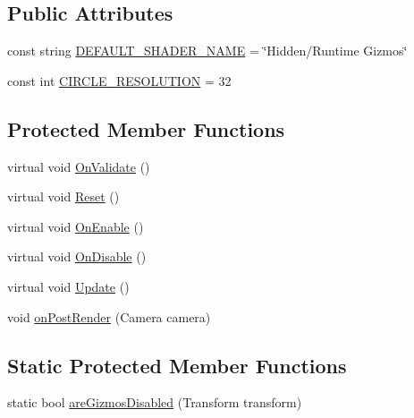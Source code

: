 \subsection*{Public Attributes}
\begin{DoxyCompactItemize}
\item 
const string \mbox{\hyperlink{class_leap_1_1_unity_1_1_runtime_gizmos_1_1_runtime_gizmo_manager_a9908e17033f014eb3d4212ee7b87e137}{D\+E\+F\+A\+U\+L\+T\+\_\+\+S\+H\+A\+D\+E\+R\+\_\+\+N\+A\+ME}} = \char`\"{}Hidden/Runtime Gizmos\char`\"{}
\item 
const int \mbox{\hyperlink{class_leap_1_1_unity_1_1_runtime_gizmos_1_1_runtime_gizmo_manager_ab07fd22968543ebaa1b62765221a0341}{C\+I\+R\+C\+L\+E\+\_\+\+R\+E\+S\+O\+L\+U\+T\+I\+ON}} = 32
\end{DoxyCompactItemize}
\subsection*{Protected Member Functions}
\begin{DoxyCompactItemize}
\item 
virtual void \mbox{\hyperlink{class_leap_1_1_unity_1_1_runtime_gizmos_1_1_runtime_gizmo_manager_a18d37fc9f8c4a472da2a506047997be3}{On\+Validate}} ()
\item 
virtual void \mbox{\hyperlink{class_leap_1_1_unity_1_1_runtime_gizmos_1_1_runtime_gizmo_manager_a970144ca56c74a639e83eea587cc9429}{Reset}} ()
\item 
virtual void \mbox{\hyperlink{class_leap_1_1_unity_1_1_runtime_gizmos_1_1_runtime_gizmo_manager_a56dfb214066df20bdaac0240e08d50f0}{On\+Enable}} ()
\item 
virtual void \mbox{\hyperlink{class_leap_1_1_unity_1_1_runtime_gizmos_1_1_runtime_gizmo_manager_af968360bff9091bc59085c515db0e081}{On\+Disable}} ()
\item 
virtual void \mbox{\hyperlink{class_leap_1_1_unity_1_1_runtime_gizmos_1_1_runtime_gizmo_manager_ad20940078be021e8ccc8a96d74c49984}{Update}} ()
\item 
void \mbox{\hyperlink{class_leap_1_1_unity_1_1_runtime_gizmos_1_1_runtime_gizmo_manager_a7efd4c7507a95cd49a44487057e69d2f}{on\+Post\+Render}} (Camera camera)
\end{DoxyCompactItemize}
\subsection*{Static Protected Member Functions}
\begin{DoxyCompactItemize}
\item 
static bool \mbox{\hyperlink{class_leap_1_1_unity_1_1_runtime_gizmos_1_1_runtime_gizmo_manager_a5feff734a890dfa873db6eb6ec63ed0c}{are\+Gizmos\+Disabled}} (Transform transform)
\end{DoxyCompactItemize}
